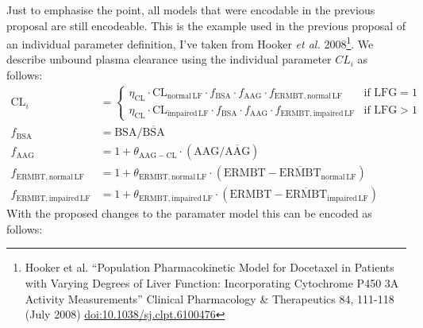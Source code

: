 \documentclass[a4paper,10pt]{article}
\begin{document}
Just to emphasise the point, all models that were encodable in the
previous proposal are still encodeable. This is the example used in
the previous proposal of an individual parameter definition,
I've taken from Hooker \emph{et al.} 2008\footnote{ Hooker
  et al. ``Population Pharmacokinetic Model for Docetaxel in Patients
  with Varying Degrees of Liver Function: Incorporating Cytochrome
  P450 3A Activity Measurements'' Clinical Pharmacology \& Therapeutics
  84, 111-118 (July 2008) \textbar
  \url{doi:10.1038/sj.clpt.6100476}}. We describe unbound plasma
clearance using the individual parameter $\mathit{CL}_i$ as follows:
%
\begin{align*}
\mathrm{CL}_i &=
\begin{cases}
\eta_{\mathrm{CL}} \cdot \mathrm{CL}_{\mathrm{normal\, LF}} \cdot f_{\mathrm{BSA}} \cdot
f_{\mathrm{AAG}} \cdot f_{\mathrm{ERMBT, normal\, LF}} & \text{if } \mathrm{LFG} = 1\\
\eta_{\mathrm{CL}} \cdot \mathrm{CL}_{\mathrm{impaired\, LF}} \cdot f_{\mathrm{BSA}} \cdot
f_{\mathrm{AAG}} \cdot f_{\mathrm{ERMBT, impaired\, LF}} & \text{if } \mathrm{LFG}
> 1
\end{cases}\\
f_{\mathrm{BSA}} &= \mathrm{BSA} / \overline{\mathrm{BSA}}\\
f_{\mathrm{AAG}} &= 1 + \theta_{\mathrm{AAG-CL}} \cdot \left(\mathrm{AAG} / \overline{\mathrm{AAG}}\right)\\
f_{\mathrm{ERMBT, normal\, LF}} &= 1 + \theta_{\mathrm{ERMBT, normal\, LF}} \cdot
\left(\mathrm{ERMBT} - \overline{\mathrm{ERMBT}}_{\mathrm{normal\, LF}}\right)\\
f_{\mathrm{ERMBT, impaired\, LF}} &= 1 + \theta_{\mathrm{ERMBT, impaired\, LF}} \cdot
\left(\mathrm{ERMBT} - \overline{\mathrm{ERMBT}}_{\mathrm{impaired\, LF}}\right)
\end{align*}
%
With the proposed changes to the paramater model this can be encoded
as follows:
%
\end{document}

